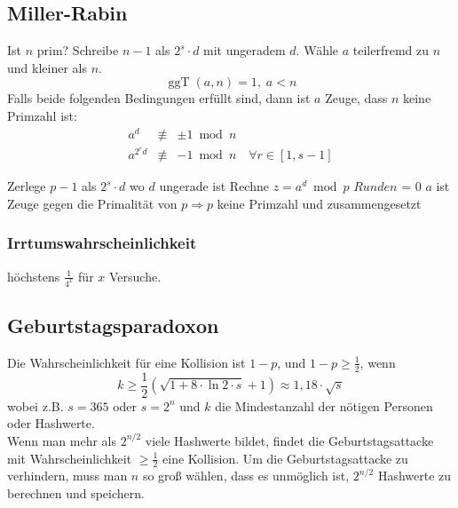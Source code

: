 \documentclass[8pt,a4paper,landscape]{article}
\begin{document}
\begin{multicols}{4}
\subsection{Miller-Rabin}
Ist $n$ prim? Schreibe $n-1$ als $2^{s}\cdot d$ mit ungeradem $d$.
Wähle $a$ teilerfremd zu $n$ und kleiner als $n$. 
\[\operatorname{ggT}(a, n) = 1, \; a<n\]
Falls beide folgenden Bedingungen erfüllt sind, dann ist $a$ Zeuge,
dass $n$ keine Primzahl ist:
\begin{eqnarray}
a^{d} &\not\equiv& \pm 1 \bmod n \nonumber\\
a^{2^{r}d} &\not\equiv& -1 \bmod n \quad \forall r \in [1,s-1]\nonumber
\end{eqnarray}
\DecMargin{1.4em}
\begin{algorithm}[H]
 Zerlege $p-1$ als $2^{s} \cdot d$ wo $d$ ungerade ist\;
 Rechne $z = a^d \bmod p$\;
 $Runden$ = 0\;
\Return $a$ ist Zeuge gegen die Primalität von $p \Rightarrow p$ keine Primzahl und zusammengesetzt\;
\end{algorithm}

\subsubsection{Irrtumswahrscheinlichkeit} höchstens $\frac{1}{4^x}$ für $x$ Versuche.

\subsection{Geburtstagsparadoxon}
Die Wahrscheinlichkeit für eine Kollision ist $1-p$, und $1-p \geq \frac{1}{2}$, wenn 
\[
k \geq  \frac{1}{2} \left( \sqrt{1 + 8 \cdot \ln 2 \cdot s} + 1 \right) \approx 1,18 \cdot \sqrt{s}  
\]
wobei z.B. $s=365$ oder $s=2^n$ und $k$ die Mindestanzahl der nötigen Personen oder Hashwerte. \\
Wenn man mehr als $2^{n/2}$ viele Hashwerte bildet, findet die Geburtstagsattacke mit Wahrscheinlichkeit $\geq \frac{1}{2}$ eine Kollision. Um die Geburtstagsattacke zu verhindern, muss man $n$ so groß wählen, dass es unmöglich ist, $2^{n/2}$ Hashwerte zu berechnen und speichern.

\end{multicols}
\end{document}
